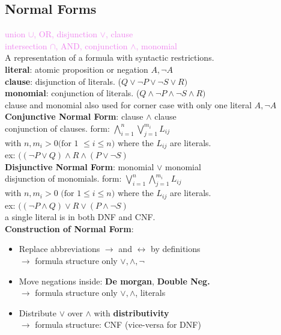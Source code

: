 \subsection*{Normal Forms} 
\fontsize{6pt}{5pt}\selectfont
\textcolor{violet}{union $\cup$, OR, disjunction $\vee$, clause} \\
\textcolor{violet}{intersection $\cap$, AND, conjunction $\wedge$, monomial} \\
\fontsize{7pt}{5pt}\selectfont
A representation of a formula with syntactic restrictions. \\
\textbf{literal}: atomic proposition or negation $A,\neg A$ \\
\textbf{clause}: disjunction of literals. ($Q \vee \neg P \vee \neg S \vee R)$ \\
\textbf{monomial}: conjunction of literals. ($Q \wedge \neg P \wedge \neg S \wedge R)$ \\
clause and monomial also used for corner case with only one literal $A,\neg A$ \\ 
\textbf{Conjunctive Normal Form}: clause $\wedge$ clause \\ 
conjunction of clauses. form: $\bigwedge_{i=1}^{n}\bigvee_{j=1}^{m_i}L_{ij}$ \\ 
with $n,m_i>0 \text{(for 1 } \leq i \leq n)$ where the $L_{ij}$ are literals. \\ 
ex: $((\neg P \vee Q) \wedge R \wedge (P \vee \neg S)$\\
\textbf{Disjunctive Normal Form}: monomial $\vee$ monomial\\
disjunction of monomials. form: $\bigvee_{i=1}^{n}\bigwedge_{j=1}^{m_i}L_{ij}$ \\
with $n, m_i > 0 \text{ (for } 1 \leq i \leq n)$ where the $L_{ij}$ are literals.\\
ex: $((\neg P \wedge Q) \vee R \vee (P \wedge \neg S)$\\
a single literal is in both DNF and CNF. \\
\textbf{Construction of Normal Form}: 
\begin{itemize}[noitemsep,topsep=0pt,leftmargin=*]
    \item Replace abbreviations $\rightarrow$ and $\leftrightarrow$ by definitions \\
    $\rightarrow$ formula structure only $\vee, \wedge, \neg$ 
    \item Move negations inside: \textbf{De morgan}, \textbf{Double Neg.} \\ 
    $\rightarrow$ formula structure only $\vee, \wedge$, literals 
    \item Distribute $\vee$ over $\wedge$ with \textbf{distributivity} \\ 
    $\rightarrow$ formula structure: CNF (vice-versa for DNF)
\end{itemize}
